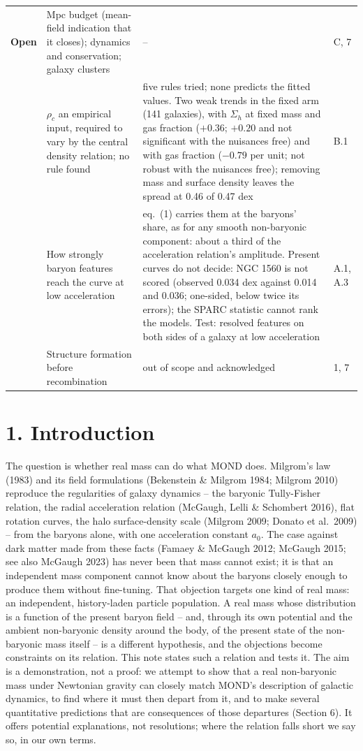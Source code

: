\documentclass[
  10pt,
]{article}
\begin{document}
{\begin{longtable}[]{@{}>{\raggedright\arraybackslash}p{2.4cm}p{5.6cm}p{5.5cm}p{1.5cm}@{}}
\midrule
\textbf{Open} & Mpc budget (mean-field indication that it closes); dynamics and conservation; galaxy clusters & -- & C, 7\tabularnewline\addlinespace[5pt]
 & $\rho_c$ an empirical input, required to vary by the central density relation; no rule found & five rules tried; none predicts the fitted values. Two weak trends in the fixed arm (141 galaxies), with $\Sigma_h$ at fixed mass and gas fraction ($+0.36$; $+0.20$ and not significant with the nuisances free) and with gas fraction ($-0.79$ per unit; not robust with the nuisances free); removing mass and surface density leaves the spread at 0.46 of 0.47 dex & B.1\tabularnewline\addlinespace[5pt]
 & How strongly baryon features reach the curve at low acceleration & eq.~(1) carries them at the baryons' share, as for any smooth non-baryonic component: about a third of the acceleration relation's amplitude. Present curves do not decide: NGC 1560 is not scored (observed 0.034 dex against 0.014 and 0.036; one-sided, below twice its errors); the SPARC statistic cannot rank the models. Test: resolved features on both sides of a galaxy at low acceleration & A.1, A.3\tabularnewline\addlinespace[5pt]
 & Structure formation before recombination & out of scope and acknowledged & 1, 7\tabularnewline
\bottomrule
\end{longtable}}


\section{1. Introduction}\label{introduction}

The question is whether real mass can do what MOND does. Milgrom's law (1983) and its field formulations (Bekenstein \& Milgrom 1984; Milgrom 2010) reproduce the regularities of galaxy dynamics -- the baryonic Tully-Fisher relation, the radial acceleration relation (McGaugh, Lelli \& Schombert 2016), flat rotation curves, the halo surface-density scale (Milgrom 2009; Donato et al.~2009) -- from the baryons alone, with one acceleration constant $a_0$. The case against dark matter made from these facts (Famaey \& McGaugh 2012; McGaugh 2015; see also McGaugh 2023) has never been that mass cannot exist; it is that an independent mass component cannot know about the baryons closely enough to produce them without fine-tuning. That objection targets one kind of real mass: an independent, history-laden particle population. A real mass whose distribution is a function of the present baryon field -- and, through its own potential and the ambient non-baryonic density around the body, of the present state of the non-baryonic mass itself -- is a different hypothesis, and the objections become constraints on its relation. This note states such a relation and tests it. The aim is a demonstration, not a proof: we attempt to show that a real non-baryonic mass under Newtonian gravity can closely match MOND's description of galactic dynamics, to find where it must then depart from it, and to make several quantitative predictions that are consequences of those departures (Section 6). It offers potential explanations, not resolutions; where the relation falls short we say so, in our own terms.
\end{document}
